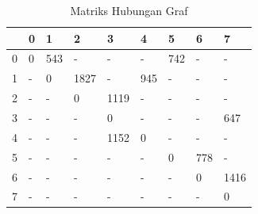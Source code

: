 \begin{table}[!htbp]
    \centering
    \caption{Matriks Hubungan Graf}
    \label{table13}
    \begin{tabular}{|l|l|l|l|l|l|l|l|l|}
    \hline
        & 0 & 1 & 2 & 3 & 4 & 5 & 6 & 7 \\
    \hline
        0 & 0 & 543 & - & - & - & 742 & - & - \\
    \hline
        1 & - & 0 & 1827 & - & 945 & - & - & - \\
    \hline
        2 & - & - & 0 & 1119 & - & - & - & - \\
    \hline
        3 & - & - & - & 0 & - & - & - & 647 \\
    \hline
        4 & - & - & - & 1152 & 0 & - & - & - \\
    \hline
        5 & - & - & - & - & - & 0 & 778 & - \\
    \hline
        6 & - & - & - & - & - & - & 0 & 1416 \\
    \hline
        7 & - & - & - & - & - & - & - & 0 \\
    \hline
    \end{tabular}
\end{table}
